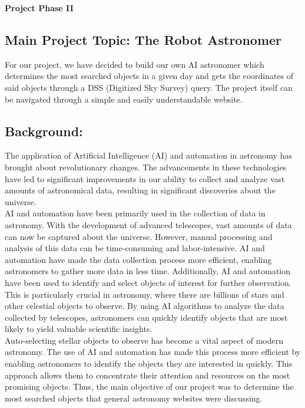 \documentclass[12pt,letterpaper]{article}
\begin{document}
  \thispagestyle{firstpagestyle}
  \begin{center}
    {\huge \textbf{Project Phase II}}
  \end{center}
    
\subsection*{Main Project Topic: The Robot Astronomer}
\quad For our project, we have decided to build our own AI astronomer which determines the most 
searched objects in a given day and gets the coordinates of said objects through a DSS (Digitized 
Sky Survey) query. The project itself can be navigated through a simple and easily understandable 
website. \\
\subsection*{Background:}
\quad The application of Artificial Intelligence (AI) and automation in astronomy has brought 
about revolutionary changes. The advancements in these technologies have led to significant 
improvements in our ability to collect and analyze vast amounts of astronomical data, resulting 
in significant discoveries about the universe. \\

\quad AI and automation have been primarily used in the collection of data in astronomy. With the 
development of advanced telescopes, vast amounts of data can now be captured about the 
universe. However, manual processing and analysis of this data can be time-consuming and 
labor-intensive. AI and automation have made the data collection process more efficient, enabling 
astronomers to gather more data in less time. Additionally, AI and automation have been used to 
identify and select objects of interest for further observation. This is particularly crucial in 
astronomy, where there are billions of stars and other celestial objects to observe. By using AI 
algorithms to analyze the data collected by telescopes, astronomers can quickly identify 
objects that are most likely to yield valuable scientific insights. \\

\quad Auto-selecting stellar objects to observe has become a vital aspect of modern astronomy. The 
use of AI and automation has made this process more efficient by enabling astronomers to identify 
the objects they are interested in quickly. This approach allows them to concentrate their attention 
and resources on the most promising objects. Thus, the main objective of our project was to 
determine the most searched objects that general astronomy websites were discussing.  \\
\end{document}
